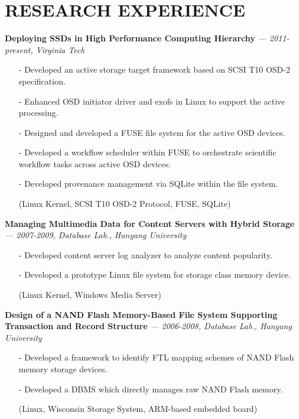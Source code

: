 \section{RESEARCH EXPERIENCE} 
\vspace{0.07in}
  {\bf Deploying SSDs in High Performance Computing Hierarchy}
    {\it \footnotesize --- 2011-present, Virginia Tech}
    \begin{itemize}[leftmargin=*]
    \setlength\itemsep{-0.02in}
    \item[-] Developed an active storage target framework based on SCSI T10 OSD-2
    specification.
    \item[-] Enhanced OSD initiator driver and exofs in Linux to support the active
    processing.
    \item[-] Designed and developed a FUSE file system for the active OSD devices.
    \item[-] Developed a workflow scheduler within FUSE to orchestrate scientific
    workflow tasks across active OSD devices.
    \item[-] Developed provenance management via SQLite within the file system.
    \item[] {\small(Linux Kernel, SCSI T10 OSD-2 Protocol, FUSE, SQLite)}
    \end{itemize}
  \vspace{-0.15in}
  {\bf Managing Multimedia Data for Content Servers with Hybrid Storage}
    {\it \footnotesize --- 2007-2009, Database Lab., Hanyang University}
    \begin{itemize}[leftmargin=*]
    \setlength\itemsep{-0.02in}
    \item[-] Developed content server log analyzer to analyze content popularity.
    \item[-] Developed a prototype Linux file system for storage class memory device.
    \item[] {\small(Linux Kernel, Windows Media Server)}
    \end{itemize}
  \vspace{-0.15in}
  {\bf Design of a NAND Flash Memory-Based File System Supporting Transaction and
      Record Structure} 
    {\it \footnotesize --- 2006-2008, Database Lab., Hanyang University}
    \begin{itemize}[leftmargin=*]
    \setlength\itemsep{-0.02in}
    \item[-] Developed a framework to identify FTL mapping schemes of NAND Flash memory
    storage devices.
    \item[-] Developed a DBMS which directly manages raw NAND Flash memory.
    \item[] {\small(Linux, Wisconsin Storage System, ARM-based embedded
     board)}
    \end{itemize}
